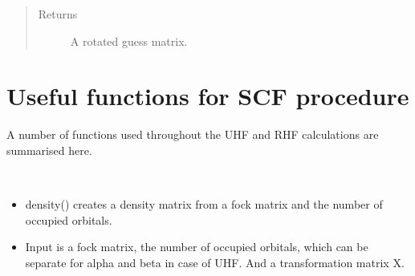 \documentclass[letterpaper,10pt,english]{sphinxmanual}
\begin{document}
\begin{fulllineitems}
\begin{fulllineitems}
\begin{sphinxVerbatim}[commandchars=\\\{\}]
          
   
  
\end{sphinxVerbatim}
\begin{quote}\begin{description}
\item[{Returns}] \leavevmode
A rotated guess matrix.

\end{description}\end{quote}

\end{fulllineitems}


\end{fulllineitems}

\label{\detokenize{SCF_functions:module-hf.SCF_functions}}

\chapter{Useful functions for SCF procedure}
\label{\detokenize{SCF_functions:useful-functions-for-scf-procedure}}\label{\detokenize{SCF_functions::doc}}
A number of functions used throughout the UHF and RHF calculations are summarised here.

\begin{fulllineitems}
\label{\detokenize{SCF_functions:hf.SCF_functions.density_matrix}}~\begin{itemize}
\item {} 
density() creates a density matrix from a fock matrix and the number of occupied orbitals.

\item {} 
Input is a fock matrix, the number of occupied orbitals, which can be separate for alpha and beta in case of UHF.
And a transformation matrix X.

\end{itemize}

\end{fulllineitems}
\end{document}
